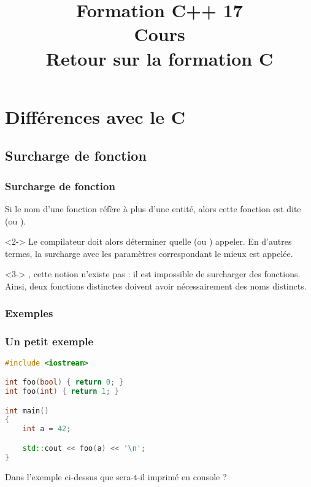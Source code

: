 \documentclass{cppcourses}
\title[Cours \no 04]{
    \large{Formation C++ 17} \\
    Cours \no 04 \\
    \small{Retour sur la formation C}
}
\begin{document}
\myforeword

\section{Différences avec le C}

\subsection{Surcharge de fonction}

\begin{frame}

\frametitle{Surcharge de fonction}

\begin{definition}
Si le nom d'une fonction réfère à plus d'une entité, alors cette fonction est dite  (ou ).
\end{definition}

\begin{remark}<2->
Le compilateur doit alors déterminer quelle  (ou ) appeler. En d'autres termes, la surcharge avec les paramètres correspondant le mieux est appelée.
\end{remark}

\begin{remark}<3->
, cette notion n'existe pas : il est impossible de surcharger des fonctions. Ainsi, deux fonctions distinctes doivent avoir nécessairement des noms distincts.
\end{remark}

\end{frame}

\subsubsection{Exemples}

\begin{frame}[fragile]

\frametitle{Un petit exemple}

\begin{example}

\begin{lstlisting}[language = c++]
#include <iostream>

int foo(bool) { return 0; }
int foo(int) { return 1; }

int main()
{
    int a = 42;

    std::cout << foo(a) << '\n';
}
\end{lstlisting}

Dans l'exemple ci-dessus que sera-t-il imprimé en console ?


\end{example}

\end{frame}
\end{document}
